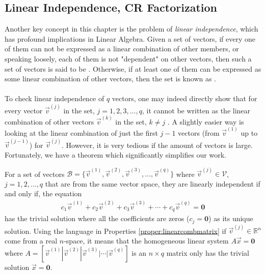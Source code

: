 \subsection{Linear Independence, CR Factorization}
\label{section:linearind}

Another key concept in this chapter is the problem of \textit{linear independence}, which has profound implications in Linear Algebra. Given a set of vectors, if every one of them can not be expressed as a linear combination of other members, or speaking loosely, each of them is not "dependent" on other vectors, then such a set of vectors is said to be . Otherwise, if at least one of them can be expressed as some linear combination of other vectors, then the set is known as .\\
\\
To check linear independence of $q$ vectors, one may indeed directly show that for every vector $\vec{v}^{(j)}$ in the set, $j = 1,2,3,\ldots,q$, it cannot be written as the linear combination of other vectors $\vec{v}^{(k)}$ in the set, $k \neq j$ . A slightly easier way is looking at the linear combination of just the first $j-1$ vectors (from $\vec{v}^{(1)}$ up to $\vec{v}^{(j-1)}$) for $\vec{v}^{(j)}$. However, it is very tedious if the amount of vectors is large. Fortunately, we have a theorem which significantly simplifies our work.
\begin{thm}
\label{thm:linearindep}
For a set of vectors $\mathcal{B} = \{\vec{v}^{(1)}, \vec{v}^{(2)}, \vec{v}^{(3)}, \ldots, \vec{v}^{(q)}\}$ where $\vec{v}^{(j)} \in \mathcal{V}$, $j=1,2,\ldots,q$ that are from the same vector space, they are linearly independent if and only if, the equation 
\begin{align*}
c_1\vec{v}^{(1)} + c_2\vec{v}^{(2)} + c_3\vec{v}^{(3)} + \cdots + c_q\vec{v}^{(q)} = \textbf{0}    
\end{align*}
has the trivial solution where all the coefficients are zeros ($c_j = \textbf{0}$) as its unique solution. Using the language in Properties \ref{proper:linearcombmatrix} if $\vec{v}^{(j)} \in \mathbb{R}^n$ come from a real $n$-space, it means that the homogeneous linear system $A\vec{x} = \textbf{0}$ where $A = [\vec{v}^{(1)}|\vec{v}^{(2)}|\vec{v}^{(3)}|\cdots|\vec{v}^{(q)}]$ is an $n \times q$ matrix only has the trivial solution $\vec{x} = \textbf{0}$.
\end{thm}
